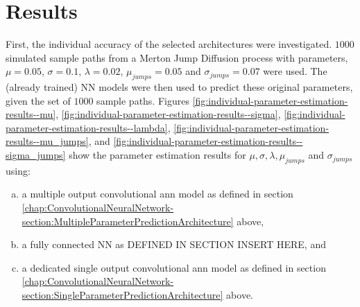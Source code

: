 \documentclass[11pt,oneside,openany,a4paper,english, report, goldenblock
]{usthesis}
\begin{document}
\chapter{Results}
\label{chapter:results}

First, the individual accuracy of the selected architectures were investigated. $1000$ simulated sample paths from a Merton Jump Diffusion process with parameters, $\mu = 0.05$, $\sigma = 0.1$, $\lambda = 0.02$, $\mu_{jumps} = 0.05$ and $\sigma_{jumps} = 0.07$ were used. The (already trained) NN models were then used to predict these original parameters, given the set of $1000$ sample paths. Figures \ref{fig:individual-parameter-estimation-results--mu}, \ref{fig:individual-parameter-estimation-results--sigma}, \ref{fig:individual-parameter-estimation-results--lambda}, \ref{fig:individual-parameter-estimation-results--mu_jumps}, and \ref{fig:individual-parameter-estimation-results--sigma_jumps} show the parameter estimation results for $\mu, \sigma, \lambda, \mu_{jumps}$ and $\sigma_{jumps}$ using: 

\begin{enumerate}[a)]
	\itemsep0em 
	\item  a multiple output convolutional \acrshort{ann} model as defined in section \ref{chap:ConvolutionalNeuralNetwork-section:MultipleParameterPredictionArchitecture} above,
	\item  a fully connected NN as DEFINED IN SECTION INSERT HERE, and
	\item  a dedicated single output convolutional \acrshort{ann} model as defined in section \ref{chap:ConvolutionalNeuralNetwork-section:SingleParameterPredictionArchitecture} above.
\end{enumerate}
\end{document}
